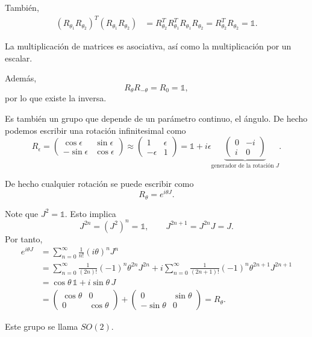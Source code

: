 \documentclass[11pt,a4paper]{article}
\begin{document}
También,
\begin{align*}
  (R_{\theta_1}R_{\theta_2})^T(R_{\theta_1}R_{\theta_2})
  &=R_{\theta_2}^TR_{\theta_1}^TR_{\theta_1}R_{\theta_2}
   =R_{\theta_2}^TR_{\theta_2}
   =\mathbb{1}.
\end{align*}

La multiplicación de matrices es asociativa, así como la multiplicación por un escalar.

Además,
\[
  R_\theta R_{-\theta}=R_0=\mathbb{1},
\]
por lo que existe la inversa.

Es también un grupo que depende de un parámetro continuo, el ángulo. De hecho podemos escribir una rotación infinitesimal como
\[
  R_\epsilon
  =
  \begin{pmatrix}
    \cos\epsilon&\sin\epsilon\\
    -\sin\epsilon&\cos\epsilon
  \end{pmatrix}
  \approx
  \begin{pmatrix}
    1&\epsilon\\
    -\epsilon&1
  \end{pmatrix}
  =\mathbb{1}+i\epsilon
  \underbrace{
  \begin{pmatrix}
    0&-i\\ i&0
  \end{pmatrix}}_{\text{generador de la rotación }J}.
\]

De hecho cualquier rotación se puede escribir como
\[
  R_\theta=e^{i\theta J}.
\]

Note que $J^2=\mathbb{1}$. Esto implica
\[
  J^{2n}=(J^2)^n=\mathbb{1},
  \qquad
  J^{2n+1}=J^{2n}J=J.
\]
Por tanto,
\begin{align*}
  e^{i\theta J}
  &=\sum_{n=0}^\infty\frac{1}{n!}(i\theta)^nJ^n \\
  &=\sum_{n=0}^\infty\frac{1}{(2n)!}(-1)^n\theta^{2n}J^{2n}
   +i\sum_{n=0}^\infty\frac{1}{(2n+1)!}(-1)^n\theta^{2n+1}J^{2n+1} \\
  &=\cos\theta\,\mathbb{1}+i\sin\theta\,J \\
  &=
  \begin{pmatrix}
    \cos\theta&0\\0&\cos\theta
  \end{pmatrix}
  +
  \begin{pmatrix}
    0&\sin\theta\\-\sin\theta&0
  \end{pmatrix}
  =R_\theta.
\end{align*}

Este grupo se llama $SO(2)$.
\end{document}
